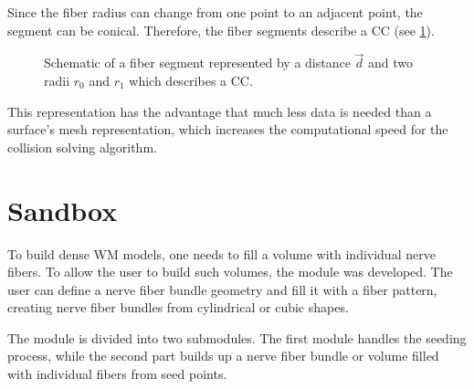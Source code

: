 %
Since the fiber radius can change from one point to an adjacent point, the segment can be conical.
Therefore, the fiber segments describe a \ac{CC} (see \cref{fig:conical}).
\par
%
\begin{figure}[!t]
    \centering
    \setlength{\tikzwidth}{0.5\textwidth}
	\caption[]{Schematic of a fiber segment represented by a distance $\vec{d}$ and two radii $r_0$ and $r_1$ which describes a  \ac{CC}.}
	\label{fig:conical}
\end{figure}
%
This representation has the advantage that much less data is needed than a surface's mesh representation, which increases the computational speed for the collision solving algorithm.
%
%
%
\section{Sandbox}\label{sec:sandbox}
%
To build dense \ac{WM} models, one needs to fill a volume with individual nerve fibers.
To allow the user to build such volumes, the module  was developed.
The user can define a nerve fiber bundle geometry and fill it with a fiber pattern, creating nerve fiber bundles from cylindrical or cubic shapes.
\par
%
The module  is divided into two submodules.
The first module handles the seeding process, while the second part builds up a nerve fiber bundle or volume filled with individual fibers from seed points.
%
%
%
